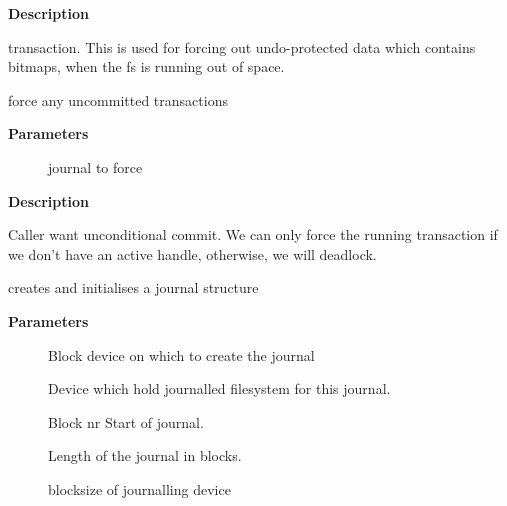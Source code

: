 \documentclass[a4paper,8pt,english]{sphinxmanual}
\begin{document}
\textbf{Description}

transaction.  This is used for forcing out undo-protected data which contains
bitmaps, when the fs is running out of space.

\begin{fulllineitems}
\label{filesystems/index:c.jbd2_journal_force_commit}
force any uncommitted transactions

\end{fulllineitems}


\textbf{Parameters}
\begin{description}
\item[{}] \leavevmode
journal to force

\end{description}

\textbf{Description}

Caller want unconditional commit. We can only force the running transaction
if we don't have an active handle, otherwise, we will deadlock.

\begin{fulllineitems}
\label{filesystems/index:c.jbd2_journal_init_dev}
creates and initialises a journal structure

\end{fulllineitems}


\textbf{Parameters}
\begin{description}
\item[{}] \leavevmode
Block device on which to create the journal

\item[{}] \leavevmode
Device which hold journalled filesystem for this journal.

\item[{}] \leavevmode
Block nr Start of journal.

\item[{}] \leavevmode
Length of the journal in blocks.

\item[{}] \leavevmode
blocksize of journalling device

\end{description}
\end{document}
